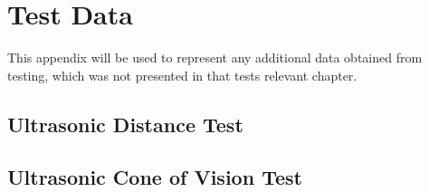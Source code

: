 \chapter{Test Data}
This appendix will be used to represent any additional data obtained from
testing, which was not presented in that tests relevant chapter.

\section{Ultrasonic Distance Test}\label{UltraDistTestData}

\section{Ultrasonic Cone of Vision Test}\label{UltraConeTestData}